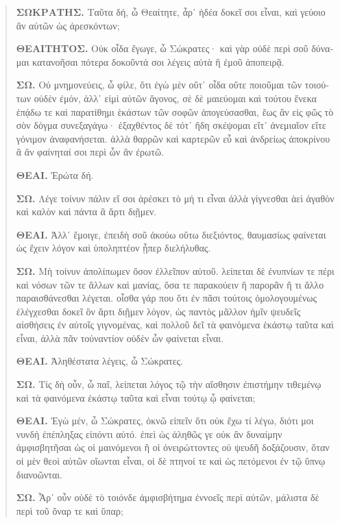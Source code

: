 \begin{quote}
    \begin{greek}
        {\textbf{ΣΩΚΡΑΤΗΣ.} Ταῦτα δή, ὦ Θεαίτητε, ἆρ᾽ ἡδέα δοκεῖ σοι εἶναι, καὶ γεύοιο ἂν αὐτῶν ὡς ἀρεσκόντων;

        \textbf{ΘΕΑΙΤΗΤΟΣ.} Οὐκ οἶδα ἔγωγε, ὦ Σώκρατες· καὶ γὰρ οὐδὲ περὶ σοῦ δύναμαι κατανοῆσαι πότερα δοκοῦντά σοι λέγεις αὐτὰ ἢ ἐμοῦ ἀποπειρᾷ.

        \textbf{ΣΩ.} Οὐ μνημονεύεις, ὦ φίλε, ὅτι ἐγὼ μὲν οὔτ᾽ οἶδα οὔτε ποιοῦμαι τῶν τοιούτων οὐδὲν ἐμόν, ἀλλ᾽ εἰμὶ αὐτῶν ἄγονος, σὲ δὲ μαιεύομαι καὶ τούτου ἕνεκα ἐπᾴδω τε καὶ παρατίθημι ἑκάστων τῶν σοφῶν ἀπογεύσασθαι, ἕως ἂν εἰς φῶς τὸ σὸν δόγμα συνεξαγάγω· ἐξαχθέντος δὲ τότ᾽ ἤδη σκέψομαι εἴτ᾽ ἀνεμιαῖον εἴτε γόνιμον ἀναφανήσεται. ἀλλὰ θαρρῶν καὶ καρτερῶν εὖ καὶ ἀνδρείως ἀποκρίνου ἃ ἂν φαίνηταί σοι περὶ ὧν ἂν ἐρωτῶ.

        \textbf{ΘΕΑΙ.} Ἐρώτα δή.

        \textbf{ΣΩ.} Λέγε τοίνυν πάλιν εἴ σοι ἀρέσκει τὸ μή τι εἶναι ἀλλὰ γίγνεσθαι ἀεὶ ἀγαθὸν καὶ καλὸν καὶ πάντα ἃ ἄρτι διῇμεν.

        \textbf{ΘΕΑΙ.} Ἀλλ᾽ ἔμοιγε, ἐπειδὴ σοῦ ἀκούω οὕτω διεξιόντος, θαυμασίως φαίνεται ὡς ἔχειν λόγον καὶ ὑποληπτέον ᾗπερ διελήλυθας.

        \textbf{ΣΩ.} Μὴ τοίνυν ἀπολίπωμεν ὅσον ἐλλεῖπον αὐτοῦ. λείπεται δὲ ἐνυπνίων τε πέρι καὶ νόσων τῶν τε ἄλλων καὶ μανίας, ὅσα τε παρακούειν ἢ παρορᾶν ἤ τι ἄλλο παραισθάνεσθαι λέγεται. οἶσθα γάρ που ὅτι ἐν πᾶσι τούτοις ὁμολογουμένως ἐλέγχεσθαι δοκεῖ ὃν ἄρτι διῇμεν λόγον, ὡς παντὸς μᾶλλον ἡμῖν ψευδεῖς αἰσθήσεις ἐν αὐτοῖς γιγνομένας, καὶ πολλοῦ δεῖ τὰ φαινόμενα ἑκάστῳ ταῦτα καὶ εἶναι, ἀλλὰ πᾶν τοὐναντίον οὐδὲν ὧν φαίνεται εἶναι.

        \textbf{ΘΕΑΙ.} Ἀληθέστατα λέγεις, ὦ Σώκρατες.

        \textbf{ΣΩ.} Τίς δὴ οὖν, ὦ παῖ, λείπεται λόγος τῷ τὴν αἴσθησιν ἐπιστήμην τιθεμένῳ καὶ τὰ φαινόμενα ἑκάστῳ ταῦτα καὶ εἶναι τούτῳ ᾧ φαίνεται;

        \textbf{ΘΕΑΙ.} Ἐγὼ μέν, ὦ Σώκρατες, ὀκνῶ εἰπεῖν ὅτι οὐκ ἔχω τί λέγω, διότι μοι νυνδὴ ἐπέπληξας εἰπόντι αὐτό. ἐπεὶ ὡς ἀληθῶς γε οὐκ ἂν δυναίμην ἀμφισβητῆσαι ὡς οἱ μαινόμενοι ἢ οἱ ὀνειρώττοντες οὐ ψευδῆ δοξάζουσιν, ὅταν οἱ μὲν θεοὶ αὐτῶν οἴωνται εἶναι, οἱ δὲ πτηνοί τε καὶ ὡς πετόμενοι ἐν τῷ ὕπνῳ διανοῶνται.

        \textbf{ΣΩ.} Ἆρ᾽ οὖν οὐδὲ τὸ τοιόνδε ἀμφισβήτημα ἐννοεῖς περὶ αὐτῶν, μάλιστα δὲ περὶ τοῦ ὄναρ τε καὶ ὕπαρ;

}
\end{greek}
\end{quote}
